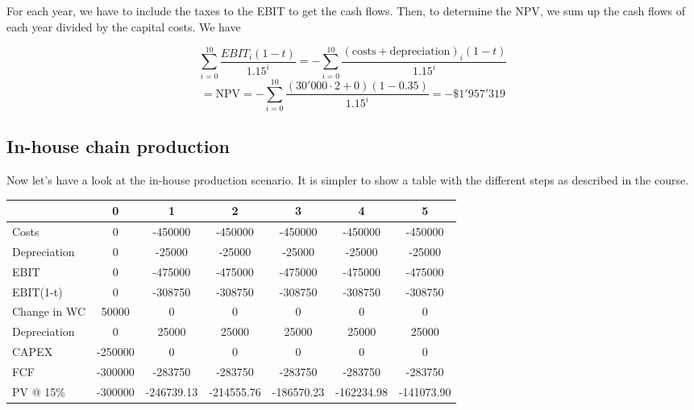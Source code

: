\documentclass[a4paper,11pt,twoside]{article}
\def \be {\begin{equation}}
\def \ee {\end{equation}}
\begin{document}
For each year, we have to include the taxes to the EBIT to get the cash flows. Then, to determine the NPV, we sum up the cash flows of each year divided by the capital costs. We have

\be
\sum^{10}_{i = 0} \frac{EBIT_i(1-t)}{1.15^i}=-\sum^{10}_{i = 0} \frac{(\mathrm{costs+depreciation})_i(1-t)}{1.15^i}
\ee
\be
=\mathrm{NPV}= -\sum^{10}_{i = 0} \frac{(30'000\cdot2+0)(1-0.35)}{1.15^i}=-\$1'957'319
\ee

\subsection*{In-house chain production}

Now let's have a look at the in-house production scenario. It is simpler to show a table with the different steps as described in the course.

\begin{tabular}{|l|c|c|c|c|c|c|}
	\hline
	& 0 & 1 & 2 & 3 & 4 & 5 \\
	\hline
	Costs & 0 & -450000 & -450000 & -450000 & -450000 & -450000 \\
	\hline
	Depreciation & 0 & -25000 & -25000 & -25000 & -25000 & -25000\\
	\hline
	EBIT & 0 & -475000 & -475000 & -475000 & -475000 & -475000 \\
	\hline
	EBIT(1-t) & 0 & -308750 & -308750 & -308750 & -308750 & -308750 \\
	\hline
	Change in WC & 50000 & 0 & 0 & 0 & 0 & 0 \\
	\hline
	Depreciation & 0 & 25000 & 25000 & 25000 & 25000 & 25000 \\
	\hline
	CAPEX & -250000 & 0 & 0 & 0 & 0 & 0\\
	\hline
	FCF & -300000 & -283750 & -283750 & -283750 & -283750 & -283750 \\
	\hline
	PV @ 15\% & -300000 & -246739.13 & -214555.76 & -186570.23 & -162234.98 & -141073.90\\
	\hline
\end{tabular}
\end{document}
